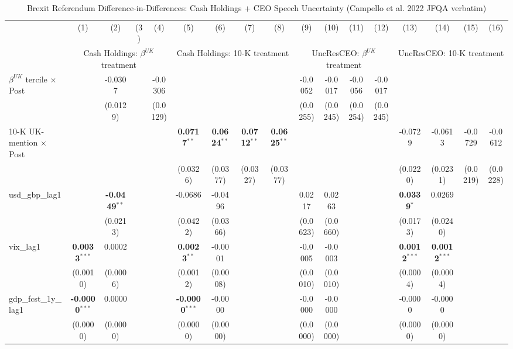 \begin{landscape}
\begin{table}[H]
\setlength{\tabcolsep}{3pt}
\renewcommand{\arraystretch}{0.85}
\centering
\caption{Brexit Referendum Difference-in-Differences: Cash Holdings + CEO Speech Uncertainty (Campello et al. 2022 JFQA verbatim)}
\label{tab:h1_5_brexit_did}
\scriptsize
\begin{tabular}{lcccccccccccccccc}
\toprule
 & (1) & (2) & (3) & (4) & (5) & (6) & (7) & (8) & (9) & (10) & (11) & (12) & (13) & (14) & (15) & (16) \\
 & \multicolumn{4}{c}{Cash Holdings: $\beta^{UK}$ treatment} & \multicolumn{4}{c}{Cash Holdings: 10-K treatment} & \multicolumn{4}{c}{UncResCEO: $\beta^{UK}$ treatment} & \multicolumn{4}{c}{UncResCEO: 10-K treatment} \\
\cmidrule(lr){2-5} \cmidrule(lr){6-9} \cmidrule(lr){10-13} \cmidrule(lr){14-17}
\midrule
$\beta^{UK}$ tercile $\times$ Post &  & -0.0307 &  & -0.0306 &  &  &  &  & -0.0052 & -0.0017 & -0.0056 & -0.0017 &  &  &  &  \\
 &  & (0.0129) &  & (0.0129) &  &  &  &  & (0.0255) & (0.0245) & (0.0254) & (0.0245) &  &  &  &  \\
10-K UK-mention $\times$ Post &  &  &  &  & \textbf{0.0717}$^{**}$ & \textbf{0.0624}$^{**}$ & \textbf{0.0712}$^{**}$ & \textbf{0.0625}$^{**}$ &  &  &  &  & -0.0729 & -0.0613 & -0.0729 & -0.0612 \\
 &  &  &  &  & (0.0326) & (0.0377) & (0.0327) & (0.0377) &  &  &  &  & (0.0220) & (0.0231) & (0.0219) & (0.0228) \\
\midrule
usd\_gbp\_lag1 &  & \textbf{-0.0449}$^{**}$ &  &  & -0.0686 & -0.0496 &  &  & 0.0217 & 0.0263 &  &  & \textbf{0.0339}$^{*}$ & 0.0269 &  &  \\
 &  & (0.0213) &  &  & (0.0422) & (0.0366) &  &  & (0.0623) & (0.0660) &  &  & (0.0173) & (0.0240) &  &  \\
vix\_lag1 & \textbf{0.0033}$^{***}$ & 0.0002 &  &  & \textbf{0.0023}$^{**}$ & -0.0001 &  &  & -0.0005 & -0.0003 &  &  & \textbf{0.0012}$^{***}$ & \textbf{0.0012}$^{***}$ &  &  \\
 & (0.0010) & (0.0006) &  &  & (0.0012) & (0.0008) &  &  & (0.0010) & (0.0010) &  &  & (0.0004) & (0.0004) &  &  \\
gdp\_fcst\_1y\_lag1 & \textbf{-0.0000}$^{***}$ & 0.0000 &  &  & \textbf{-0.0000}$^{***}$ & -0.0000 &  &  & -0.0000 & -0.0000 &  &  & -0.0000 & -0.0000 &  &  \\
 & (0.0000) & (0.0000) &  &  & (0.0000) & (0.0000) &  &  & (0.0000) & (0.0000) &  &  & (0.0000) & (0.0000) &  &  \\

\end{tabular}
\end{table}
\end{landscape}
